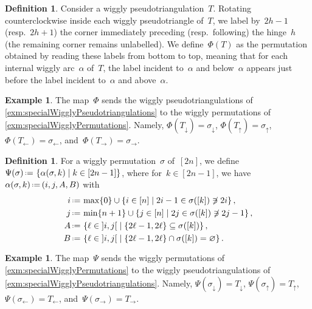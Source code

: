 \documentclass{amsart}
\theoremstyle{definition}
\newtheorem{definition}[theorem]{Definition}
\newtheorem{example}[theorem]{Example}
\newcommand{\set}[2]{\left\{ #1 \;\middle|\; #2 \right\}} %
\newcommand{\eqdef}{\mbox{\,\raisebox{0.2ex}{\scriptsize\ensuremath{\mathrm:}}\ensuremath{=}\,}} %
\begin{document}
\begin{definition}
\label{def:bijection1}
Consider a wiggly pseudotriangulation~$T$.
Rotating counterclockwise inside each wiggly pseudotriangle of~$T$, we label by~$2h-1$ (resp.~$2h+1$) the corner immediately preceding (resp.~following) the hinge~$h$ (the remaining corner remains unlabelled).
We define~$\Phi(T)$ as the permutation obtained by reading these labels from bottom to top, meaning that for each internal wiggly arc~$\alpha$ of~$T$, the label incident to~$\alpha$ and below~$\alpha$ appears just before the label incident to~$\alpha$ and above~$\alpha$.
\end{definition}

\begin{example}
The map~$\Phi$ sends the wiggly pseudotriangulations of \cref{exm:specialWigglyPseudotriangulations} to the wiggly permutations of \cref{exm:specialWigglyPermutations}.
Namely, $\Phi(T_\downarrow) = \sigma_\downarrow$, $\Phi(T_\uparrow) = \sigma_\uparrow$, $\Phi(T_\leftarrow) = \sigma_\leftarrow$, and~$\Phi(T_\rightarrow) = \sigma_\rightarrow$.
\end{example}

\begin{definition}
\label{def:bijection2}
For a wiggly permutation~$\sigma$ of~$[2n]$, we define~$\Psi(\sigma) \eqdef \set{\alpha(\sigma, k)}{k \in [2n-1]}$, where for~$k \in [2n-1]$, we have~$\alpha(\sigma, k) \eqdef ( i, j, A, B)$ with
\begin{align*}
i & \eqdef \max \{0\} \cup \set{i \in [n]}{2i-1 \in \sigma([k]) \not\ni 2i}, \\
j & \eqdef \min \{n+1\} \cup \set{j \in [n]}{2j \in \sigma([k]) \not\ni 2j-1}, \\
A & \eqdef \set{\ell \in {]i,j[}}{\{2\ell-1, 2\ell\} \subseteq \sigma([k])}, \\
B & \eqdef \set{\ell \in {]i,j[}}{\{2\ell-1, 2\ell\} \cap \sigma([k]) = \varnothing}.
\end{align*}
\end{definition}

\begin{example}
The map~$\Psi$ sends the wiggly permutations of \cref{exm:specialWigglyPermutations} to the wiggly pseudotriangulations of \cref{exm:specialWigglyPseudotriangulations}.
Namely, $\Psi(\sigma_\downarrow) = T_\downarrow$, $\Psi(\sigma_\uparrow) = T_\uparrow$, $\Psi(\sigma_\leftarrow) = T_\leftarrow$, and~$\Psi(\sigma_\rightarrow) = T_\rightarrow$.
\end{example}
\end{document}
